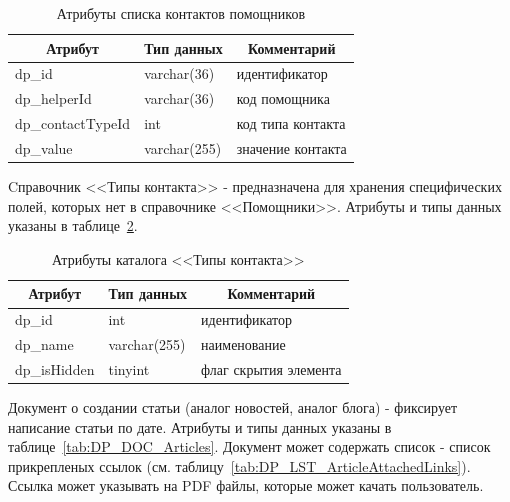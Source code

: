 \begin{table}[!htb]
    \centering\small

    \caption{Атрибуты списка контактов помощников}
    \label{tab:DP_LST_HelperContacts}

    \begin{tabular}{|p{5cm}|p{2.5cm}|p{9cm}|}
        \hline
        \multicolumn{1}{|c|}{Атрибут}
        & \multicolumn{1}{c|}{Тип данных}
        & \multicolumn{1}{c|}{Комментарий}
        \\ \hline

        dp\_id & varchar(36) & идентификатор \\ \hline
        dp\_helperId & varchar(36) & код помощника \\ \hline
        dp\_contactTypeId & int & код типа контакта \\ \hline
        dp\_value & varchar(255) & значение контакта \\ \hline
    \end{tabular}
\end{table}

Cправочник <<Типы контакта>> - предназначена для хранения специфических полей, которых нет в справочнике <<Помощники>>.
Атрибуты и типы данных указаны в таблице~\ref{tab:DP_CTL_ContactTypes}.

\begin{table}[!htb]
    \centering\small

    \caption{Атрибуты каталога <<Типы контакта>>}
    \label{tab:DP_CTL_ContactTypes}

    \begin{tabular}{|p{5cm}|p{2.5cm}|p{9cm}|}
        \hline
        \multicolumn{1}{|c|}{Атрибут}
        & \multicolumn{1}{c|}{Тип данных}
        & \multicolumn{1}{c|}{Комментарий}
        \\ \hline

        dp\_id & int & идентификатор \\ \hline
        dp\_name & varchar(255) & наименование \\ \hline
        dp\_isHidden & tinyint & флаг скрытия элемента \\ \hline
    \end{tabular}
\end{table}

Документ о создании статьи (аналог новостей, аналог блога) - фиксирует написание статьи по дате.
Атрибуты и типы данных указаны в таблице~\ref{tab:DP_DOC_Articles}.
Документ может содержать список - список прикрепленых ссылок (см. таблицу~\ref{tab:DP_LST_ArticleAttachedLinks}).
Ссылка может указывать на PDF файлы, которые может качать пользователь.

